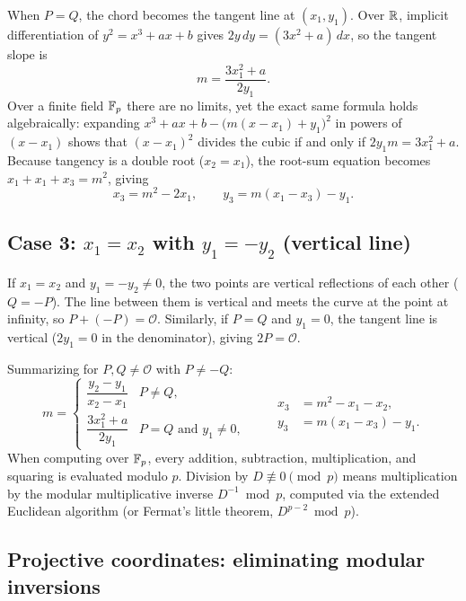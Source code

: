 When $P = Q$, the chord becomes the tangent line at $(x_1, y_1)$. Over $\mathbb{R}$, implicit
differentiation of $y^2 = x^3 + ax + b$ gives $2y\,dy = (3x^2+a)\,dx$, so the tangent
slope is
\[
m = \frac{3x_1^2 + a}{2y_1}.
\]
Over a finite field $\mathbb{F}_p$ there are no limits, yet the exact same formula holds
algebraically: expanding $x^3 + ax + b - \bigl(m(x - x_1) + y_1\bigr)^2$ in powers of
$(x - x_1)$ shows that $(x - x_1)^2$ divides the cubic if and only if $2y_1 m = 3x_1^2 + a$.
Because tangency is a double root ($x_2 = x_1$), the root-sum equation becomes
$x_1 + x_1 + x_3 = m^2$, giving
\begin{equation}
\label{ch21:double-x}
x_3 = m^2 - 2x_1, \qquad y_3 = m(x_1 - x_3) - y_1.
\end{equation}

\subsection*{Case 3: $x_1 = x_2$ with $y_1 = -y_2$ (vertical line)}

If $x_1 = x_2$ and $y_1 = -y_2 \neq 0$, the two points are vertical reflections of each
other ($Q = -P$). The line between them is vertical and meets the curve at the point at
infinity, so $P + (-P) = \mathcal{O}$. Similarly, if $P = Q$ and $y_1 = 0$, the tangent
line is vertical ($2y_1 = 0$ in the denominator), giving $2P = \mathcal{O}$.

\begin{formalbox}
Summarizing for $P,Q \neq \mathcal{O}$ with $P \neq -Q$:
\[
m = \begin{cases}
\dfrac{y_2-y_1}{x_2-x_1} & P \neq Q,\\[1.2em]
\dfrac{3x_1^2+a}{2y_1} & P = Q \text{ and } y_1 \neq 0,
\end{cases}
\qquad
\begin{aligned}
x_3 &= m^2 - x_1 - x_2,\\
y_3 &= m(x_1 - x_3) - y_1.
\end{aligned}
\]
When computing over $\mathbb{F}_p$, every addition, subtraction, multiplication, and squaring
is evaluated modulo $p$. Division by $D \not\equiv 0 \pmod p$ means multiplication by the
modular multiplicative inverse $D^{-1} \bmod p$, computed via the extended Euclidean
algorithm (or Fermat's little theorem, $D^{p-2} \bmod p$).
\end{formalbox}

\subsection{Projective coordinates: eliminating modular inversions}
\label{ch21:projective}

